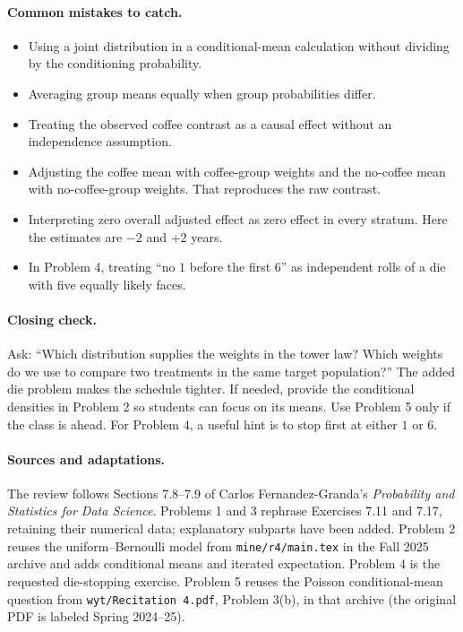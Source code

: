 \documentclass[11pt]{article}
\begin{document}
\paragraph{Common mistakes to catch.}
\begin{itemize}[leftmargin=1.5em,itemsep=0.45em]
  \item Using a joint distribution in a conditional-mean calculation without
    dividing by the conditioning probability.
  \item Averaging group means equally when group probabilities differ.
  \item Treating the observed coffee contrast as a causal effect without
    an independence assumption.
  \item Adjusting the coffee mean with coffee-group weights and the no-coffee
    mean with no-coffee-group weights. That reproduces the raw contrast.
  \item Interpreting zero overall adjusted effect as zero effect in every
    stratum. Here the estimates are $-2$ and $+2$ years.
  \item In Problem 4, treating ``no $1$ before the first $6$'' as independent
    rolls of a die with five equally likely faces.
\end{itemize}

\paragraph{Closing check.}
Ask: ``Which distribution supplies the weights in the tower law? Which
weights do we use to compare two treatments in the same target population?''
The added die problem makes the schedule tighter. If needed, provide the
conditional densities in Problem 2 so students can focus on its means.
Use Problem 5 only if the class is ahead. For Problem 4, a useful hint is to
stop first at either $1$ or $6$.

\paragraph{Sources and adaptations.}
The review follows Sections 7.8--7.9 of Carlos Fernandez-Granda's
\emph{Probability and Statistics for Data Science}.
Problems 1 and 3 rephrase Exercises 7.11 and 7.17, retaining their numerical
data; explanatory subparts have been added.
Problem 2 reuses the uniform--Bernoulli model from
\texttt{mine/r4/main.tex} in the Fall 2025 archive and adds conditional means
and iterated expectation. Problem 4 is the requested die-stopping exercise.
Problem 5 reuses the Poisson conditional-mean
question from \texttt{wyt/Recitation 4.pdf}, Problem 3(b), in that archive
(the original PDF is labeled Spring 2024--25).
\fi
\end{document}
